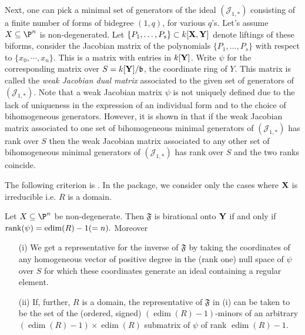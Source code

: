 \documentclass[11pt]{amsart}%
\numberwithin{equation}{theorem}
\def\XX{{\bf X}}
\def\YY{{\bf Y}}
\renewcommand{\:}{\colon}
\DeclareMathOperator{\edim}{edim}
\theoremstyle{theorem}
\begin{document}


Next, one can pick a minimal set of generators of the ideal $({\mathcal J}_{1,*})$ consisting of a finite number
of forms of bidegree $(1,q)$, for various $q$'s.
Let's assume  $X\subseteq \P^n$ is non-degenerated. Let $\{P_1,\ldots,P_s\}\subset k[\XX,\YY]$ denote liftings of these biforms,
 consider the Jacobian matrix of the polynomials $\{P_1,\ldots,P_s\}$ with respect to $\{x_0,\cdots,x_n\}$. This is a matrix with entries in $k[\YY]$.
Write $\psi$ for the corresponding matrix over $S=k[\YY]/{\mathfrak b}$, the coordinate ring of $Y$. This matrix is called   the \emph{weak Jacobian dual matrix}  associated to
the given set of generators of $({\mathcal J}_{1,*})$.
Note that a weak Jacobian matrix $\psi$ is not uniquely defined due to the lack of uniqueness in the expression of
an individual form and to the choice of bihomogeneous generators. However, it is shown in \cite[Lemma 2.13]{DoriaHassanzadehSimisBirationality} that if the weak Jacobian matrix associated  to one set of bihomogeneous minimal generators of
$({\mathcal J}_{1,*})$ has  rank over $S$ then the weak Jacobian matrix associated to any other
set of bihomogeneous minimal generators of
$({\mathcal J}_{1,*})$ has  rank over $S$ and the two ranks coincide.

\vspace{0.2in}
The  following  criterion is   \cite[Theorem 2.18 ]{DoriaHassanzadehSimisBirationality}. In the package, we consider only the cases where $\XX$ is irreducible i.e. $R$ is a domain.
\begin{theorem} \label{T birationality}Let $X\subseteq \P^n$ be non-degenerate. Then $\mathfrak{F}$ is birational onto $\YY$  if and only if ${\rm rank}(\psi)=\edim(R)-1(=n).$
Moreover
\begin{enumerate}
  \item[{\rm (i)}] We get a representative for the inverse of $\mathfrak{F}$ by taking the coordinates of any homogeneous vector of positive degree
in the {\rm (}rank one{\rm )} null space of $\psi$ over $S$ for which these coordinates generate an ideal containing
a regular element.

\item[{\rm (ii)}] If, further, $R$ is a domain, the representative of $\mathfrak{F}$ in {\rm (i)}
can be taken to be the set of the {\rm (}ordered, signed{\rm )} $(\edim(R)-1)$-minors
of an arbitrary $(\edim(R)-1)\times \edim(R)$ submatrix of $\psi$ of rank $\edim(R)-1$.
\end{enumerate}

\end{theorem}
\end{document}
